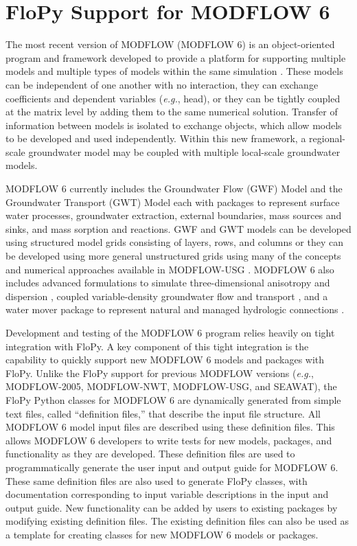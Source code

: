\documentclass[12pt, oneside]{article}  	%
\begin{document}
\section*{FloPy Support for MODFLOW 6}

The most recent version of MODFLOW (MODFLOW 6) is an object-oriented program and framework developed to provide a platform for supporting multiple models and multiple types of models within the same simulation \citep{modflow6framework}. These models can be independent of one another with no interaction, they can exchange coefficients and dependent variables (\textit{e.g.}, head), or they can be tightly coupled at the matrix level by adding them to the same numerical solution. Transfer of information between models is isolated to exchange objects, which allow models to be developed and used independently. Within this new framework, a regional-scale groundwater model may be coupled with multiple local-scale groundwater models. 

MODFLOW 6 currently includes the Groundwater Flow (GWF) Model and the Groundwater Transport (GWT) Model each with packages to represent surface water processes, groundwater extraction, external boundaries, mass sources and sinks, and mass sorption and reactions. GWF and GWT models can be developed using structured model grids consisting of layers, rows, and columns or they can be developed using more general unstructured grids using many of the concepts and numerical approaches available in MODFLOW-USG \citep{modflowusg}. MODFLOW 6 also includes advanced formulations to simulate three-dimensional anisotropy and dispersion \citep{modflow6xt3d}, coupled variable-density groundwater flow and transport \citep{langevin2020hydraulic}, and a water mover package to represent natural and managed hydrologic connections \citep{morway2021use}.

Development and testing of the MODFLOW 6 program relies heavily on tight integration with FloPy. A key component of this tight integration is the capability to quickly support new MODFLOW 6 models and packages with FloPy. Unlike the FloPy support for previous MODFLOW versions (\textit{e.g.}, MODFLOW-2005, MODFLOW-NWT, MODFLOW-USG, and SEAWAT), the FloPy Python classes for MODFLOW 6 are dynamically generated from simple text files, called ``definition files,'' that describe the input file structure. All MODFLOW 6 model input files are described using these definition files. This allows MODFLOW 6 developers to write tests for new models, packages, and functionality as they are developed. These definition files are used to programmatically generate the user input and output guide for MODFLOW 6. These same definition files are also used to generate FloPy classes, with documentation corresponding to input variable descriptions in the input and output guide. New functionality can be added by users to existing packages by modifying existing definition files. The existing definition files can also be used as a template for creating classes for new MODFLOW 6 models or packages.
\end{document}
